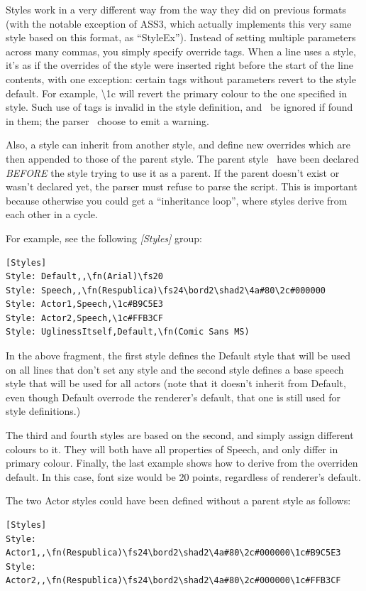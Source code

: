 \documentclass{spec}
\begin{document}
Styles work in a very different way from the way they did on previous formats (with the notable exception
of ASS3, which actually implements this very same style based on this format, as ``StyleEx'').
Instead of setting multiple parameters across many commas, you simply specify override tags. When a line
uses a style, it's as if the overrides of the style were inserted right before the start of the line
contents, with one exception: certain tags without parameters revert to the style default. For example,
\textbackslash 1c will revert the primary colour to the one specified in style. Such use of tags is invalid
in the style definition, and \must\ be ignored if found in them; the parser \may\ choose to emit a warning.

Also, a style can inherit from another style, and define new overrides which are then appended to those
of the parent style. The parent style \must\ have been declared \emph{BEFORE} the style trying to use
it as a parent. If the parent doesn't exist or wasn't declared yet, the parser must refuse to parse the
script. This is important because otherwise you could get a ``inheritance loop'', where styles derive from
each other in a cycle.

For example, see the following \emph{[Styles]} group:

\begin{verbatim}
[Styles]
Style: Default,,\fn(Arial)\fs20
Style: Speech,,\fn(Respublica)\fs24\bord2\shad2\4a#80\2c#000000
Style: Actor1,Speech,\1c#B9C5E3
Style: Actor2,Speech,\1c#FFB3CF
Style: UglinessItself,Default,\fn(Comic Sans MS)
\end{verbatim}

In the above fragment, the first style defines the Default style that will be used on all lines that
don't set any style and the second style defines a base speech style that will be used for all actors
(note that it doesn't inherit from Default, even though Default overrode the renderer's default, that
one is still used for style definitions.)

The third and fourth styles are based on the second, and simply assign different colours to it. They
will both have all properties of Speech, and only differ in primary colour. Finally, the last example
shows how to derive from the overriden default. In this case, font size would be 20 points, regardless
of renderer's default.

The two Actor styles could have been defined without a parent style as follows:

\begin{verbatim}
[Styles]
Style: Actor1,,\fn(Respublica)\fs24\bord2\shad2\4a#80\2c#000000\1c#B9C5E3
Style: Actor2,,\fn(Respublica)\fs24\bord2\shad2\4a#80\2c#000000\1c#FFB3CF
\end{verbatim}
\end{document}
